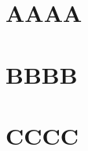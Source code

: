 \documentclass{book}
\begin{document}
\chapter{AAAA}
\lipsum[1-3]

\chapter*{BBBB}
\lipsum[1-3]

\chapter{CCCC}
\lipsum[1-3]
\end{document}
